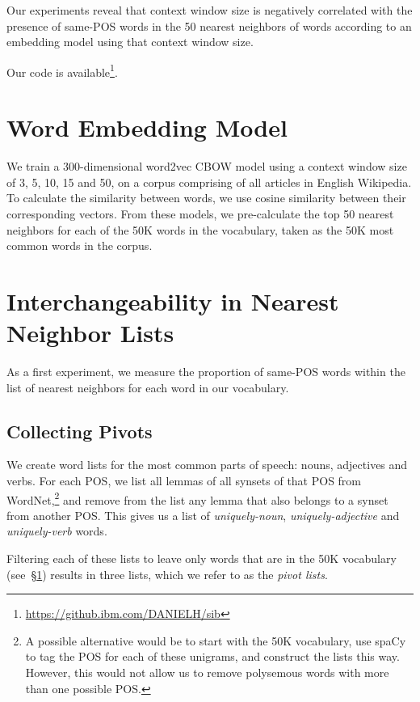 \documentclass{article}
\begin{document}
    Our experiments reveal that context window size is negatively correlated
    with the presence of same-POS words in the 50 nearest neighbors of words
    according to an embedding model using that context window size.
    
    Our code is available\footnote{\url{https://github.ibm.com/DANIELH/sib}}.
    
    \section{Word Embedding Model}\label{sec:model}
    
    We train a 300-dimensional word2vec CBOW model using a context window size of
    3, 5, 10, 15 and 50, on a corpus comprising of all articles in English Wikipedia.
    To calculate the similarity between words, we use cosine similarity
    between their corresponding vectors.
    From these models, we pre-calculate the top 50 nearest neighbors for
    each of the 50K words in the vocabulary, taken as the 50K most common
    words in the corpus.
    
    
    \section{Interchangeability in Nearest Neighbor Lists}\label{sec:nn}
    
    As a first experiment, we measure the proportion of same-POS words
    within the list of nearest neighbors for each word in our vocabulary.
    
    \subsection{Collecting Pivots}\label{sec:pivots}
    
    We create word lists for the most
    common parts of speech: nouns, adjectives and verbs.
    For each POS, we list all lemmas of all synsets of that POS from
    WordNet,\footnote{A possible alternative would be to start with the 50K
    vocabulary, use spaCy to tag the POS for each of these unigrams,
    and construct the lists this way.
    However, this would not allow us to remove polysemous words with more
    than one possible POS.}
    and remove from the list any lemma that also belongs to a synset from
    another POS.
    This gives us a list of \textit{uniquely-noun}, \textit{uniquely-adjective}
    and \textit{uniquely-verb} words.
    
    Filtering each of these lists to leave only words that are in
    the 50K vocabulary (see~\S\ref{sec:model}) results in three lists,
    which we refer to as the \textit{pivot lists}.
    
\end{document}
